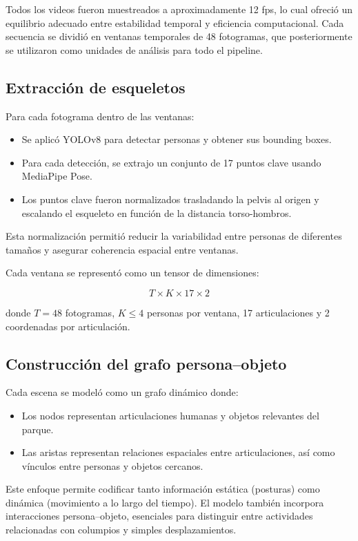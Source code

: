 \documentclass{article}
\begin{document}
Todos los videos fueron muestreados a aproximadamente 12 fps, lo cual ofreció un equilibrio adecuado entre estabilidad temporal y eficiencia computacional. Cada secuencia se dividió en ventanas temporales de 48 fotogramas, que posteriormente se utilizaron como unidades de análisis para todo el pipeline.

\subsection{Extracción de esqueletos}

Para cada fotograma dentro de las ventanas:

\begin{itemize}
    \item Se aplicó YOLOv8 para detectar personas y obtener sus bounding boxes.
    \item Para cada detección, se extrajo un conjunto de 17 puntos clave usando MediaPipe Pose.
    \item Los puntos clave fueron normalizados trasladando la pelvis al origen y escalando el esqueleto en función de la distancia torso-hombros.
\end{itemize}

Esta normalización permitió reducir la variabilidad entre personas de diferentes tamaños y asegurar coherencia espacial entre ventanas.

Cada ventana se representó como un tensor de dimensiones:

\[
T \times K \times 17 \times 2
\]

donde \(T = 48\) fotogramas, \(K \leq 4\) personas por ventana, 17 articulaciones y 2 coordenadas por articulación.

\subsection{Construcción del grafo persona–objeto}

Cada escena se modeló como un grafo dinámico donde:

\begin{itemize}
    \item Los nodos representan articulaciones humanas y objetos relevantes del parque.
    \item Las aristas representan relaciones espaciales entre articulaciones, así como vínculos entre personas y objetos cercanos.
\end{itemize}

Este enfoque permite codificar tanto información estática (posturas) como dinámica (movimiento a lo largo del tiempo). El modelo también incorpora interacciones persona–objeto, esenciales para distinguir entre actividades relacionadas con columpios y simples desplazamientos.
\end{document}
